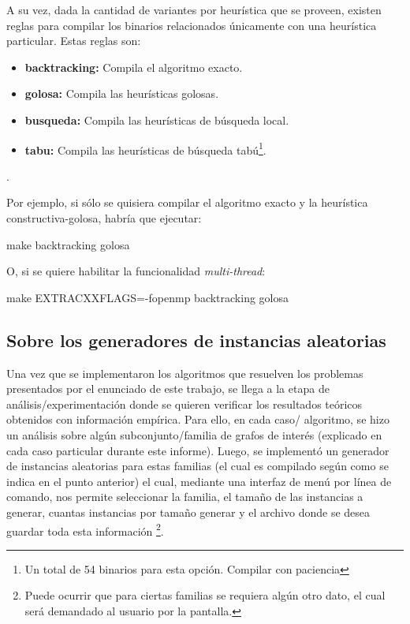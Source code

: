 \bigskip
\par A su vez, dada la cantidad de variantes por heur\'istica que se
    proveen, existen reglas para compilar los binarios relacionados
    \'unicamente con una heur\'istica particular. Estas reglas son:

\begin{itemize}
    \item \textbf{backtracking: } Compila el algoritmo exacto.
    \item \textbf{golosa: } Compila las heur\'isticas golosas.
    \item \textbf{busqueda: } Compila las heur\'isticas de b\'usqueda local.
    \item \textbf{tabu: } Compila las heur\'isticas de b\'usqueda tab\'u\footnote{%
        Un total de 54 binarios para esta opci\'on. Compilar con paciencia}.
\end{itemize}.

\par Por ejemplo, si s\'olo se quisiera compilar el algoritmo exacto
    y la heur\'istica constructiva-golosa, habr\'ia que ejecutar:

\bigskip
\par make backtracking golosa
\bigskip

\bigskip
\par O, si se quiere habilitar la funcionalidad \emph{multi-thread}:
\bigskip
\par make EXTRACXXFLAGS=-fopenmp backtracking golosa

{}
\subsection*{Sobre los generadores de instancias aleatorias}
\par Una vez que se implementaron los algoritmos que resuelven los problemas
    presentados por el enunciado de este trabajo, se llega a la etapa de
    an\'alisis/experimentaci\'on donde se quieren verificar los resultados
    te\'oricos obtenidos con informaci\'on emp\'irica. Para ello, en cada caso/%
    algoritmo, se hizo un an\'alisis sobre alg\'un subconjunto/familia de grafos
    de inter\'es (explicado en cada caso particular durante este informe). Luego,
    se implement\'o un generador de instancias aleatorias para estas familias
    (el cual es compilado seg\'un como se indica en el punto anterior) el cual,
    mediante una interfaz de men\'u por l\'inea de comando, nos permite seleccionar
    la familia, el tama\~no de las instancias a generar, cuantas instancias por
    tama\~no generar y el archivo donde se desea guardar toda esta informaci\'on%
    \footnote{Puede ocurrir que para ciertas familias se requiera alg\'un otro dato,
    el cual ser\'a demandado al usuario por la pantalla.}.

